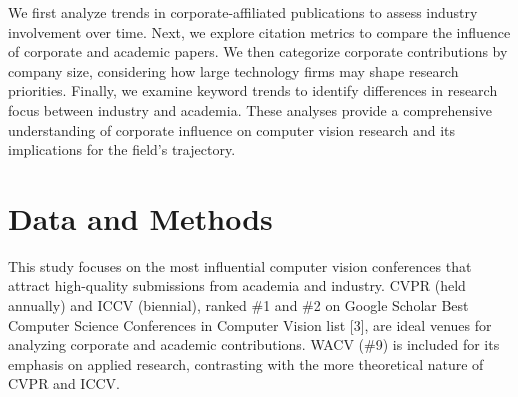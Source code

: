 \documentclass{article}
\begin{document}
We first analyze trends in corporate-affiliated publications to assess industry involvement over time. Next, we explore citation metrics to compare the influence of corporate and academic papers. We then categorize corporate contributions by company size, considering how large technology firms may shape research priorities. Finally, we examine keyword trends to identify differences in research focus between industry and academia. These analyses provide a comprehensive understanding of corporate influence on computer vision research and its implications for the field’s trajectory.
\vspace{-7pt}
\section{Data and Methods}
\vspace{-7pt}
This study focuses on the most influential computer vision conferences that attract high-quality submissions from academia and industry. CVPR (held annually) and ICCV (biennial), ranked \#1 and \#2 on Google Scholar Best Computer Science Conferences in Computer Vision list [3], are ideal venues for analyzing corporate and academic contributions. WACV (\#9) is included for its emphasis on applied research, contrasting with the more theoretical nature of CVPR and ICCV.
\end{document}

